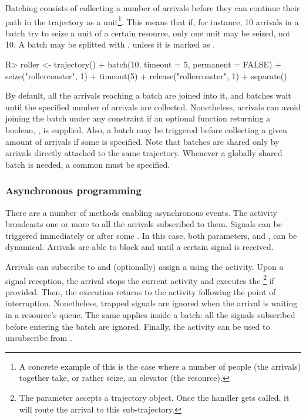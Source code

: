 \documentclass[
  nojss]{jss}
\begin{document}
Batching consists of collecting a number of arrivals before they can
continue their path in the trajectory as a unit\footnote{A concrete
  example of this is the case where a number of people (the arrivals)
  together take, or rather seize, an elevator (the resource).}. This
means that if, for instance, 10 arrivals in a batch try to seize a unit
of a certain resource, only one unit may be seized, not 10. A batch may
be splitted with , unless it is marked as
.

\begin{CodeChunk}
\begin{CodeInput}
R> roller <- trajectory() %
+   batch(10, timeout = 5, permanent = FALSE) %
+   seize("rollercoaster", 1) %
+   timeout(5) %
+   release("rollercoaster", 1) %
+   separate()
\end{CodeInput}
\end{CodeChunk}

By default, all the arrivals reaching a batch are joined into it, and
batches wait until the specified number of arrivals are collected.
Nonetheless, arrivals can avoid joining the batch under any constraint
if an optional function returning a boolean, , is supplied.
Also, a batch may be triggered before collecting a given amount of
arrivals if some  is specified. Note that batches are
shared only by arrivals directly attached to the same trajectory.
Whenever a globally shared batch is needed, a common  must be
specified.

\hypertarget{asynchronous-programming}{%
\subsubsection{Asynchronous
programming}\label{asynchronous-programming}}

There are a number of methods enabling asynchronous events. The
 activity broadcasts one or more  to all the
arrivals subscribed to them. Signals can be triggered immediately or
after some . In this case, both parameters, 
and , can be dynamical. Arrivals are able to block and
 until a certain signal is received.

Arrivals can subscribe to  and (optionally) assign a
 using the  activity. Upon a signal
reception, the arrival stops the current activity and executes the
\footnote{The  parameter accepts a
  trajectory object. Once the handler gets called, it will route the
  arrival to this sub-trajectory.} if provided. Then, the execution
returns to the activity following the point of interruption.
Nonetheless, trapped signals are ignored when the arrival is waiting in
a resource's queue. The same applies inside a batch: all the signals
subscribed before entering the batch are ignored. Finally, the
 activity can be used to unsubscribe from .
\end{document}
